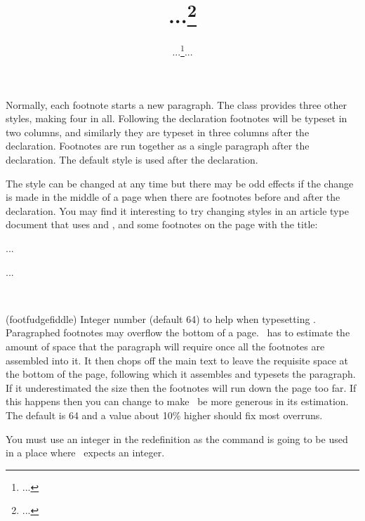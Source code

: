 Normally, each footnote 
starts a new paragraph. The class provides three
other styles, making four in all. 
Following the \cmd{\twocolumnfootnotes}
declaration footnotes will be typeset in two columns, and similarly
they are typeset in three columns 
after the \cmd{\threecolumnfootnotes}
declaration. Footnotes are run together as a single 
paragraph after the
\cmd{\paragraphfootnotes} declaration. The default style is used after
the \cmd{\plainfootnotes} declaration. 

   The style can be changed at any 
time but there may be odd effects if the change is made in the middle of
a page when there are footnotes before and after the declaration. You may
find it interesting to try changing styles in an article type document 
that uses \cmd{\maketitle} and \cmd{\thanks}, and some footnotes on the 
page with the title:
\begin{lcode}
\title{...\thanks{...}}
\author{...\thanks{...}...}
...

\paragraphfootnotes
\maketitle
\plainfootnotes
...
\end{lcode}

\begin{syntax}
\cmd{\footfudgefiddle} \\
\end{syntax}
\glossary(footfudgefiddle)%
  {}%
  {Integer number (default 64) to help when typesetting .}
Paragraphed footnotes may overflow 
the bottom of a page. \tx\ has
to estimate the amount of space that the paragraph will require once
all the footnotes are assembled into it. It then chops off the main text
to leave the requisite space at the bottom of the page, following which
it assembles and typesets the paragraph. If it underestimated the size
then the footnotes will run down the page too far. If this happens then
you can change \cmd{\footfudgefiddle} to make \tx\ be more generous in
its estimation. The default is 64 and a value about 10\% higher should
fix most overruns.
\begin{lcode}
\renewcommand*{\footfudgefiddle}{70}
\end{lcode}
You must use an integer in the redefinition as the command is going to be 
used in a place where \tx\ expects an integer.

